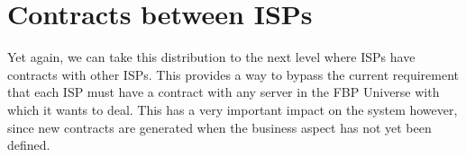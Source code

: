 \section{Contracts between ISPs}
Yet again, we can take this distribution to the next level where ISPs have contracts with other ISPs. This provides a way to bypass the current requirement that each ISP must have a contract with any server in the FBP Universe with which it wants to deal. This has a very important impact on the system however, since new contracts are generated when the business aspect has not yet been defined.\\

